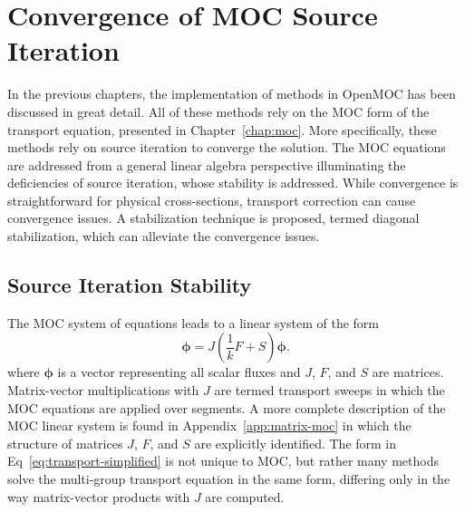 \chapter{Convergence of MOC Source Iteration}
\label{chap:moc-convergence}

In the previous chapters, the implementation of methods in OpenMOC has been discussed in great detail. All of these methods rely on the \ac{MOC} form of the transport equation, presented in Chapter~\ref{chap:moc}. More specifically, these methods rely on source iteration to converge the solution. The \ac{MOC} equations are addressed from a general linear algebra perspective illuminating the deficiencies of source iteration, whose stability is addressed. While convergence is straightforward for physical cross-sections, transport correction can cause convergence issues. A stabilization technique is proposed, termed diagonal stabilization, which can alleviate the convergence issues.

\section{Source Iteration Stability}
\label{sec:source-iteration}

The \ac{MOC} system of equations leads to a linear system of the form
\begin{equation}
	\boldsymbol{\phi} = J \left(\frac{1}{k} F + S \right) \boldsymbol{\phi}.
	\label{eq:transport-simplified}
\end{equation}
where $\boldsymbol{\phi}$ is a vector representing all scalar fluxes and $J$, $F$, and $S$ are matrices. Matrix-vector multiplications with $J$ are termed transport sweeps in which the \ac{MOC} equations are applied over segments. A more complete description of the \ac{MOC} linear system is found in Appendix~\ref{app:matrix-moc} in which the structure of matrices $J$, $F$, and $S$ are explicitly identified. The form in Eq~\ref{eq:transport-simplified} is not unique to \ac{MOC}, but rather many methods solve the multi-group transport equation in the same form, differing only in the way matrix-vector products with $J$ are computed.

